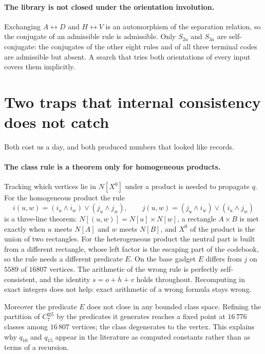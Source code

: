 \documentclass[11pt]{article}
\theoremstyle{definition}
\begin{document}
\paragraph{The library is not closed under the orientation involution.}
Exchanging $A \leftrightarrow D$ and $H \leftrightarrow V$ is an automorphism of the separation
relation, so the conjugate of an admissible rule is admissible. Only $S_{2a}$ and $S_{3a}$ are
self-conjugate: the conjugates of the other eight rules and of all three terminal codes are
admissible but absent. A search that tries both orientations of every input covers them
implicitly.

\section{Two traps that internal consistency does not catch}

Both cost us a day, and both produced numbers that looked like records.

\paragraph{The class rule is a theorem only for homogeneous products.}
Tracking which vertices lie in $N[X^0]$ under a product is needed to propagate $q$. For the
homogeneous product the rule
\[
  i(u,w) = (i_u \wedge i_w) \vee (j_u \wedge j_w), \qquad
  j(u,w) = (j_u \wedge i_w) \vee (i_u \wedge j_w)
\]
is a three-line theorem: $N[(u,w)] = N[u] \times N[w]$, a rectangle $A \times B$ is met exactly
when $u$ meets $N[A]$ and $w$ meets $N[B]$, and $X^0$ of the product is the union of two
rectangles. For the heterogeneous product the neutral part is built from a different rectangle,
whose left factor is the escaping part of the codebook, so the rule needs a different predicate
$E$. On the base gadget $E$ differs from $j$ on $5589$ of $16807$ vertices. The arithmetic of the
wrong rule is perfectly self-consistent, and the identity $s = o + h + v$ holds throughout.
Recomputing in exact integers does not help: exact arithmetic of a wrong formula stays wrong.

Moreover the predicate $E$ does not close in any bounded class space. Refining the partition of
$C_7^{\boxtimes 5}$ by the predicates it generates reaches a fixed point at $16\,776$ classes
among $16\,807$ vertices; the class degenerates to the vertex. This explains why $q_{10}$ and
$q_{15}$ appear in the literature as computed constants rather than as terms of a recursion.
\end{document}
